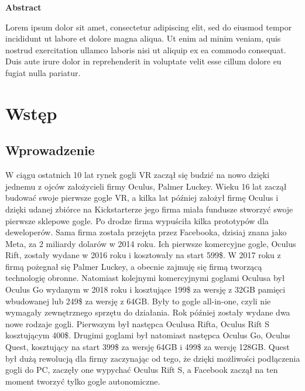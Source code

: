 \documentclass[a4paper,12pt,reqno]{article}
\begin{document}
\newpage
\begin{flushleft}
\Large \textbf{Abstract}
\end{flushleft}
\vspace{1cm}


Lorem ipsum dolor sit amet, consectetur adipiscing elit, sed do eiusmod tempor incididunt ut labore et dolore magna aliqua. Ut enim ad minim veniam, quis nostrud exercitation ullamco laboris nisi ut aliquip ex ea commodo consequat. Duis aute irure dolor in reprehenderit in voluptate velit esse cillum dolore eu fugiat nulla pariatur.

\newpage

\section{Wstęp}

\subsection{Wprowadzenie}

W ciągu ostatnich 10 lat rynek gogli VR zaczął się budzić na nowo dzięki jednemu z ojców założycieli firmy Oculus, Palmer Luckey. Wieku 16 lat zaczął budować swoje pierwsze gogle VR, a kilka lat później założył firmę Oculus i dzięki udanej zbiórce na Kickstarterze jego firma miała fundusze stworzyć swoje pierwsze sklepowe gogle. Po drodze firma wypuściła kilka prototypów dla deweloperów. Sama firma została przejęta przez Facebooka, dzisiaj znana jako Meta, za 2 miliardy dolarów w 2014 roku. Ich pierwsze komercyjne gogle, Oculus Rift, zostały wydane w 2016 roku i kosztowały na start 599\$. W 2017 roku z firmą pożegnał się Palmer Luckey, a obecnie zajmuję się firmą tworzącą technologię obronne. Natomiast kolejnymi komercyjnymi goglami Oculusa był Oculus Go wydanym w 2018 roku i kosztujące 199\$ za wersję z 32GB pamięci wbudowanej lub 249\$ za wersję z 64GB. Były to gogle all-in-one, czyli nie wymagały zewnętrznego sprzętu do działania. Rok później zostały wydane dwa nowe rodzaje gogli. Pierwszym był następca Oculusa Rifta, Oculus Rift S kosztującym 400\$. Drugimi goglami był natomiast następca Oculus Go, Oculus Quest, kosztujący na start 399\$ za wersję 64GB i 499\$ za wersję 128GB. Quest był dużą rewolucją dla firmy zaczynając od tego, że dzięki możliwości podłączenia gogli do PC, zaczęły one wypychać Oculus Rift S, a Facebook zaczął na ten moment tworzyć tylko gogle autonomiczne. 
\end{document}
